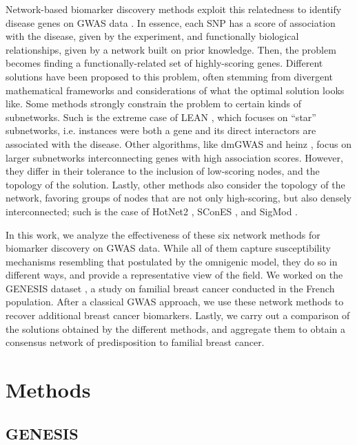 \documentclass[10pt,letterpaper]{article}
\begin{document}
Network-based biomarker discovery methods exploit this relatedness to identify disease genes on GWAS data \cite{azencott_network-guided_2016}. In essence, each SNP has a score of association with the disease, given by the experiment, and functionally biological relationships, given by a network built on prior knowledge. Then, the problem becomes finding a functionally-related set of highly-scoring genes. Different solutions have been proposed to this problem, often stemming from divergent mathematical frameworks and considerations of what the optimal solution looks like. Some methods strongly constrain the problem to certain kinds of subnetworks. Such is the extreme case of LEAN \cite{gwinner_network-based_2016}, which focuses on ``star'' subnetworks, i.e. instances were both a gene and its direct interactors are associated with the disease. Other algorithms, like dmGWAS \cite{jia_dmgwas:_2011} and heinz \cite{dittrich_identifying_2008}, focus on larger subnetworks interconnecting genes with high association scores. However, they differ in their tolerance to the inclusion of low-scoring nodes, and the topology of the solution. Lastly, other methods also consider the topology of the network, favoring groups of nodes that are not only high-scoring, but also densely interconnected; such is the case of HotNet2 \cite{leiserson_pan-cancer_2015}, SConES \cite{azencott_efficient_2013}, and SigMod \cite{liu_sigmod:_2017}.

In this work, we analyze the effectiveness of these six network methods for biomarker discovery on GWAS data. While all of them capture susceptibility mechanisms resembling that postulated by the omnigenic model, they do so in different ways, and provide a representative view of the field. We worked on the GENESIS dataset \cite{sinilnikova_genesis:_2016}, a study on familial breast cancer conducted in the French population. After a classical GWAS approach, we use these network methods to recover additional breast cancer biomarkers. Lastly, we carry out a comparison of the solutions obtained by the different methods, and aggregate them to obtain a consensus network of predisposition to familial breast cancer. 

\section{Methods}
\subsection{GENESIS}
\end{document}
